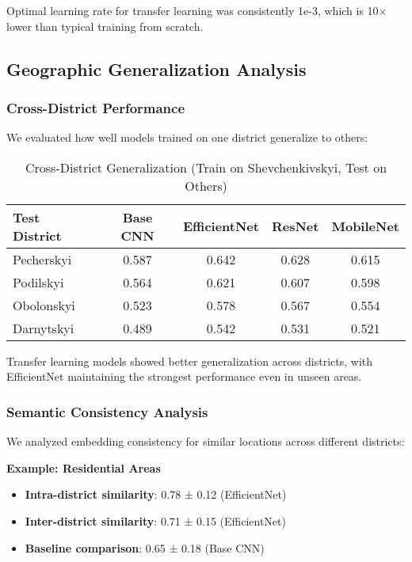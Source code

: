 Optimal learning rate for transfer learning was consistently 1e-3, which is 10× lower than typical training from scratch.

\subsection{Geographic Generalization Analysis}

\subsubsection{Cross-District Performance}

We evaluated how well models trained on one district generalize to others:

\begin{table}[H]
\centering
\caption{Cross-District Generalization (Train on Shevchenkivskyi, Test on Others)}
\begin{tabular}{|l|c|c|c|c|}
\hline
\textbf{Test District} & \textbf{Base CNN} & \textbf{EfficientNet} & \textbf{ResNet} & \textbf{MobileNet} \\
\hline
Pecherskyi & 0.587 & 0.642 & 0.628 & 0.615 \\
Podilskyi & 0.564 & 0.621 & 0.607 & 0.598 \\
Obolonskyi & 0.523 & 0.578 & 0.567 & 0.554 \\
Darnytskyi & 0.489 & 0.542 & 0.531 & 0.521 \\
\hline
\end{tabular}
\end{table}

Transfer learning models showed better generalization across districts, with EfficientNet maintaining the strongest performance even in unseen areas.

\subsubsection{Semantic Consistency Analysis}

We analyzed embedding consistency for similar locations across different districts:

\textbf{Example: Residential Areas}
\begin{itemize}
    \item \textbf{Intra-district similarity}: 0.78 ± 0.12 (EfficientNet)
    \item \textbf{Inter-district similarity}: 0.71 ± 0.15 (EfficientNet)
    \item \textbf{Baseline comparison}: 0.65 ± 0.18 (Base CNN)
\end{itemize}

